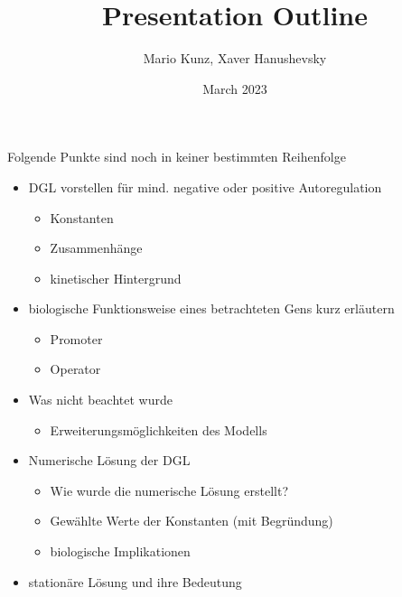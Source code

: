 \documentclass{article}
\title{Presentation Outline}
\author{Mario Kunz, Xaver Hanushevsky}
\date{March 2023}
\begin{document}
Folgende Punkte sind noch in keiner bestimmten Reihenfolge

\begin{itemize}
    \item DGL vorstellen für mind. negative oder positive Autoregulation
    \begin{itemize}
        \item Konstanten
        \item Zusammenhänge
        \item kinetischer Hintergrund
    \end{itemize}
    \item biologische Funktionsweise eines betrachteten Gens kurz erläutern
    \begin{itemize}
        \item Promoter
        \item Operator
    \end{itemize}
    \item Was nicht beachtet wurde
    \begin{itemize}
        \item Erweiterungsmöglichkeiten des Modells
    \end{itemize}
    \item Numerische Lösung der DGL
    \begin{itemize}
        \item Wie wurde die numerische Lösung erstellt?
        \item Gewählte Werte der Konstanten (mit Begründung)
        \item biologische Implikationen
    \end{itemize}
    \item stationäre Lösung und ihre Bedeutung
\end{itemize}
\end{document}
